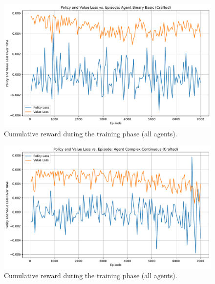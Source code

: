 \documentclass[sigconf]{acmart}
\begin{document}
\begin{figure}[t]
  \centering
  \includegraphics[width=\textwidth]{policy_value_loss_Binary Basic (Crafted).pdf}
  \caption{Cumulative reward during the training phase (all agents).}
  \label{fig:policy_value_loss_Binary Basic (Crafted)}
\end{figure}


\begin{figure}[t]
  \centering
  \includegraphics[width=\textwidth]{policy_value_loss_Complex Continuous (Crafted).pdf}
  \caption{Cumulative reward during the training phase (all agents).}
  \label{fig:policy_value_loss_Complex Continuous (Crafted)}
\end{figure}
\end{document}
